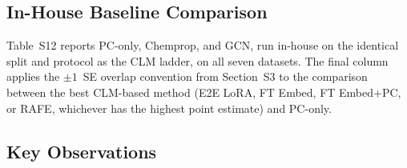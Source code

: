 \documentclass[9pt,a4paper]{article}
\begin{document}

\subsection*{In-House Baseline Comparison}

Table~S12 reports PC-only, Chemprop, and GCN, run in-house on the identical split
and protocol as the CLM ladder, on all seven datasets. The final column applies
the $\pm1$~SE overlap convention from Section~S3 to the comparison between the best
CLM-based method (E2E LoRA, FT Embed, FT Embed+PC, or RAFE, whichever has the
highest point estimate) and PC-only.


\begin{table}[htbp]
\centering
\caption{In-house PC-only/Chemprop/GCN baselines vs.\ the best CLM-based
method, all seven datasets. Primary metric: MCC (classification), Spearman
(regression). ``Confirmed'' means the CLM-based winner's band does not overlap
PC-only's at $\pm1$~SE.}
\label{tab:s11_inhouse}
\end{table}

\subsection*{Key Observations}
\end{document}
